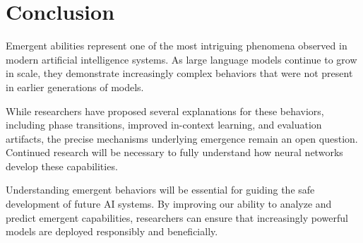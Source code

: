 \documentclass[conference]{IEEEtran}
\begin{document}
\section{Conclusion}

Emergent abilities represent one of the most intriguing phenomena observed in modern artificial intelligence systems. As large language models continue to grow in scale, they demonstrate increasingly complex behaviors that were not present in earlier generations of models.

While researchers have proposed several explanations for these behaviors, including phase transitions, improved in-context learning, and evaluation artifacts, the precise mechanisms underlying emergence remain an open question. Continued research will be necessary to fully understand how neural networks develop these capabilities.

Understanding emergent behaviors will be essential for guiding the safe development of future AI systems. By improving our ability to analyze and predict emergent capabilities, researchers can ensure that increasingly powerful models are deployed responsibly and beneficially.



\end{document}
